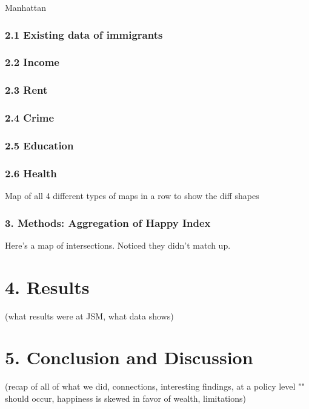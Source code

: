 \documentclass{article}\usepackage[]{graphicx}\usepackage[]{color}
\begin{document}
Manhattan

\subsubsection*{2.1 Existing data of immigrants}

\subsubsection*{2.2 Income}


\subsubsection*{2.3 Rent}


\subsubsection*{2.4 Crime}


\subsubsection*{2.5 Education}


\subsubsection*{2.6 Health}


Map of all 4 different types of maps in a row to show the diff shapes

\subsubsection*{3. Methods: Aggregation of Happy Index}
Here's a map of intersections. Noticed they didn't match up.


\section*{4. Results} (what results were at JSM, what data shows)




\section*{5. Conclusion and Discussion} (recap of all of what we did, connections, interesting findings, at a policy level "" should occur, happiness is skewed in favor of wealth, limitations)
\end{document}
